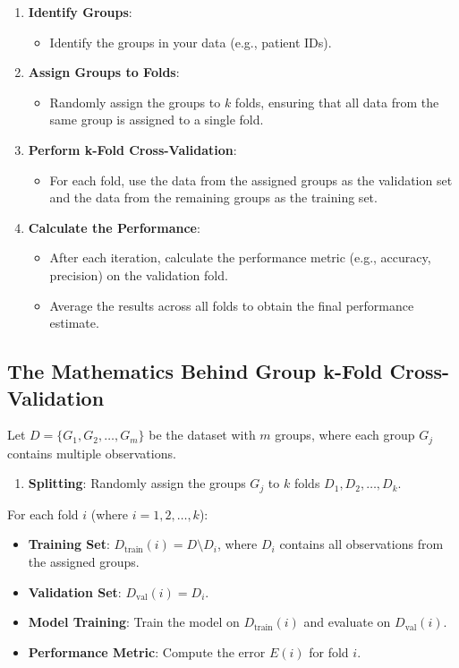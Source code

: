 \documentclass[10pt]{article}
\begin{document}
\begin{enumerate}
    \item \textbf{Identify Groups}:
    \begin{itemize}
        \item Identify the groups in your data (e.g., patient IDs).
    \end{itemize}
    \item \textbf{Assign Groups to Folds}:
    \begin{itemize}
        \item Randomly assign the groups to \(k\) folds, ensuring that all data from the same group is assigned to a single fold.
    \end{itemize}
    \item \textbf{Perform k-Fold Cross-Validation}:
    \begin{itemize}
        \item For each fold, use the data from the assigned groups as the validation set and the data from the remaining groups as the training set.
    \end{itemize}
    \item \textbf{Calculate the Performance}:
    \begin{itemize}
        \item After each iteration, calculate the performance metric (e.g., accuracy, precision) on the validation fold.
        \item Average the results across all folds to obtain the final performance estimate.
    \end{itemize}
\end{enumerate}

\subsection{The Mathematics Behind Group k-Fold Cross-Validation}
Let \(D = \{G_1, G_2, \dots, G_m\}\) be the dataset with \(m\) groups, where each group \(G_j\) contains multiple observations.

\begin{enumerate}
    \item \textbf{Splitting}: Randomly assign the groups \(G_j\) to \(k\) folds \(D_1, D_2, \dots, D_k\).
\end{enumerate}

For each fold \(i\) (where \(i=1,2,\dots,k\)):

\begin{itemize}
    \item \textbf{Training Set}: \(D_{\text{train}}(i) = D \setminus D_i\), where \(D_i\) contains all observations from the assigned groups.
    \item \textbf{Validation Set}: \(D_{\text{val}}(i) = D_i\).
    \item \textbf{Model Training}: Train the model on \(D_{\text{train}}(i)\) and evaluate on \(D_{\text{val}}(i)\).
    \item \textbf{Performance Metric}: Compute the error \(E(i)\) for fold \(i\).
\end{itemize}
\end{document}

